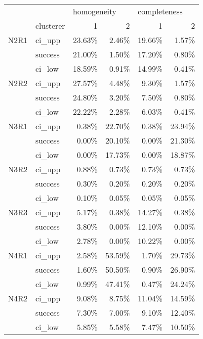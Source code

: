 \begin{tabular}{llrrrr}
\toprule
     & {} & \multicolumn{2}{l}{homogeneity} & \multicolumn{2}{l}{completeness} \\
     & clusterer &           1 &      2 &            1 &      2 \\
\midrule
N2R1 & ci\_upp &      23.63\% &  2.46\% &       19.66\% &  1.57\% \\
     & success &      21.00\% &  1.50\% &       17.20\% &  0.80\% \\
     & ci\_low &      18.59\% &  0.91\% &       14.99\% &  0.41\% \\
N2R2 & ci\_upp &      27.57\% &  4.48\% &        9.30\% &  1.57\% \\
     & success &      24.80\% &  3.20\% &        7.50\% &  0.80\% \\
     & ci\_low &      22.22\% &  2.28\% &        6.03\% &  0.41\% \\
N3R1 & ci\_upp &       0.38\% & 22.70\% &        0.38\% & 23.94\% \\
     & success &       0.00\% & 20.10\% &        0.00\% & 21.30\% \\
     & ci\_low &       0.00\% & 17.73\% &        0.00\% & 18.87\% \\
N3R2 & ci\_upp &       0.88\% &  0.73\% &        0.73\% &  0.73\% \\
     & success &       0.30\% &  0.20\% &        0.20\% &  0.20\% \\
     & ci\_low &       0.10\% &  0.05\% &        0.05\% &  0.05\% \\
N3R3 & ci\_upp &       5.17\% &  0.38\% &       14.27\% &  0.38\% \\
     & success &       3.80\% &  0.00\% &       12.10\% &  0.00\% \\
     & ci\_low &       2.78\% &  0.00\% &       10.22\% &  0.00\% \\
N4R1 & ci\_upp &       2.58\% & 53.59\% &        1.70\% & 29.73\% \\
     & success &       1.60\% & 50.50\% &        0.90\% & 26.90\% \\
     & ci\_low &       0.99\% & 47.41\% &        0.47\% & 24.24\% \\
N4R2 & ci\_upp &       9.08\% &  8.75\% &       11.04\% & 14.59\% \\
     & success &       7.30\% &  7.00\% &        9.10\% & 12.40\% \\
     & ci\_low &       5.85\% &  5.58\% &        7.47\% & 10.50\% \\

\end{tabular}
